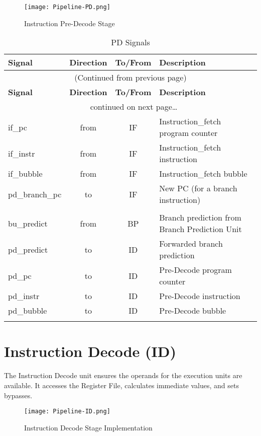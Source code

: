 \begin{figure}[th]
  \texttt{[image: Pipeline-PD.png]}
  \caption{Instruction Pre-Decode Stage}
\end{figure}

\begin{longtable}[]{@{}lccl@{}}
	\toprule
	\textbf{Signal} & \textbf{Direction} & \textbf{To/From} & \textbf{Description}\tabularnewline
	\midrule
	\endfirsthead
	\multicolumn{4}{c}{{(Continued from previous page)}} \\
	\toprule
	\textbf{Signal} & \textbf{Direction} & \textbf{To/From} & \textbf{Description}\tabularnewline
	\midrule
	\endhead
	\midrule \multicolumn{4}{c}{{\tablename\ \thetable{} continued on next page\ldots}} \\
	\endfoot
	\endlastfoot
	
	if\_pc         & from &	IF	& Instruction\_fetch program counter\\
	if\_instr	   & from &	IF	& Instruction\_fetch instruction\\
	if\_bubble	   & from &	IF	& Instruction\_fetch bubble\\
	pd\_branch\_pc & to	  & IF	& New PC (for a branch instruction)\\
	\\
	bu\_predict	   & from &	BP	& Branch prediction from Branch Prediction Unit\\
	pd\_predict	   & to	  & ID	& Forwarded branch prediction\\
	pd\_pc	       & to	  & ID  & Pre-Decode program counter\\
	pd\_instr	   & to	  & ID	& Pre-Decode instruction\\
	pd\_bubble	   & to	  & ID	& Pre-Decode bubble	\\
	\bottomrule
	\caption{PD Signals}
	\label{tab:pd-signals}
\end{longtable}

\pagebreak

\section{Instruction Decode (ID)}\label{instruction-decode-id-1}

The Instruction Decode unit ensures the operands for the execution units
are available. It accesses the Register File, calculates immediate
values, and sets bypasses.

\begin{figure}[h]
  \texttt{[image: Pipeline-ID.png]}
  \caption{Instruction Decode Stage Implementation}
\end{figure}


